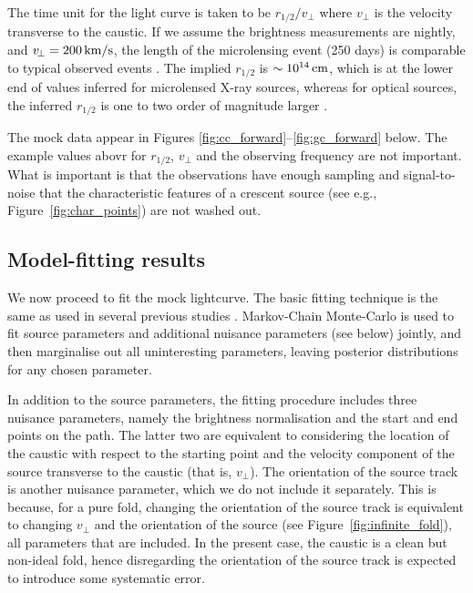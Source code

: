 \documentclass[usenatbib]{mn2e}
\begin{document}
The time unit for the light curve is taken to be $r_{1/2}/v_{\!\perp}$
where $v_{\!\perp}$ is the velocity transverse to the caustic.  If we
assume the brightness measurements are nightly, and
$v_{\!\perp}=\rm200\,km/s$, the length of the microlensing event (250
days) is comparable to typical observed events \cite[see
  e.g.,][]{2015ApJ...814L..26M}. The implied $r_{1/2}$ is
$\sim10^{14}\rm\,cm$, which is at the lower end of values inferred for
microlensed X-ray sources, whereas for optical sources, the inferred
$r_{1/2}$ is one to two order of magnitude larger \citep[see, e.g.,
  Figure~8 of][]{0004-637X-769-1-53}.  

The mock data appear in Figures
\ref{fig:cc_forward}--\ref{fig:gc_forward} below.  The example values
abovr for $r_{1/2}$, $v_{\!\perp}$ and the observing frequency are not
important.  What is important is that the observations have enough
sampling and signal-to-noise that the characteristic features of a
crescent source (see e.g., Figure~\ref{fig:char_points}) are not
washed out.


\subsection{Model-fitting results}

We now proceed to fit the mock lightcurve.  The basic fitting
technique is the same as used in several previous studies
\citep[e.g.,][]{2010ApJ...712..658P}.  Markov-Chain Monte-Carlo is
used to fit source parameters and additional nuisance parameters (see
below) jointly, and then marginalise out all uninteresting parameters,
leaving posterior distributions for any chosen parameter.

In addition to the source parameters, the fitting procedure includes
three nuisance parameters, namely the brightness normalisation and the
start and end points on the path.  The latter two are equivalent to
considering the location of the caustic with respect to the starting
point and the velocity component of the source transverse to the
caustic (that is, $v_{\!\perp}$).  The orientation of the source track
is another nuisance parameter, which we do not include it separately.
This is because, for a pure fold, changing the orientation of the
source track is equivalent to changing $v_{\!\perp}$ and the
orientation of the source (see Figure~\ref{fig:infinite_fold}), all
parameters that are included.  In the present case, the caustic is a
clean but non-ideal fold, hence disregarding the orientation of the
source track is expected to introduce some systematic error.
\end{document}
